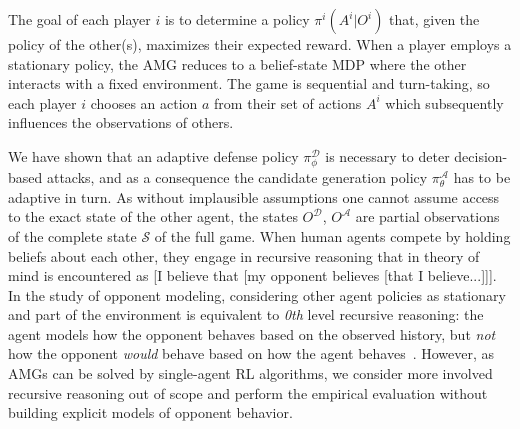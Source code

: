 The goal of each player $i$ is to determine a policy $\pi^{i}(A^i | O^i)$ that, given the policy of the other(s), maximizes their expected reward.
When a player employs a stationary policy, the AMG reduces to a belief-state MDP where the other interacts with a fixed environment.
The game is sequential and turn-taking, so each player $i$ chooses an action $a$ from their set of actions $A^i$ which subsequently influences the observations of others.

We have shown that an adaptive defense policy $\pi^{\mathcal{D}}_\phi$ is necessary to deter decision-based attacks, and as a consequence the candidate generation policy $\pi^{\mathcal{A}}_\theta$ has to be adaptive in turn.
As without implausible assumptions one cannot assume access to the exact state of the other agent, the states $O^{\mathcal{D}}$, $O^{\mathcal{A}}$ are partial observations of the complete state $\mathcal{S}$ of the full game.
When human agents compete by holding beliefs about each other, they engage in recursive reasoning that in theory of mind is encountered as [I believe that [my opponent believes [that I believe...]]].
In the study of opponent modeling, considering other agent policies as stationary and part of the environment is equivalent to \textit{0th} level recursive reasoning:
the agent models how the opponent behaves based on the observed history, but \emph{not} how the opponent \emph{would} behave based on how the agent behaves~\cite{albrecht2018autonomous, wen2019probabilistic}.
However, as AMGs can be solved by single-agent RL algorithms, we consider more involved recursive reasoning out of scope and perform the empirical evaluation without building explicit models of opponent behavior.



